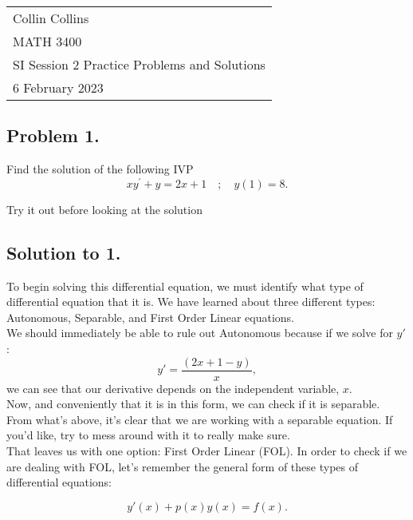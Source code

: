 \documentclass[a4paper,12pt]{article}
\begin{document}

\thispagestyle{empty}

\begin{tabular}{p{15.5cm}}
\\ Collin Collins \\
MATH 3400\\
SI Session 2 Practice Problems and Solutions\\
6 February 2023 \\
\hline

\end{tabular} 

\subsection*{Problem 1.}

Find the solution of the following IVP
$$ x y^{\prime}+y=2 x+1 \quad;\quad y(1)=8.$$

Try it out before looking at the solution

\pagebreak

\subsection*{Solution to 1.}

To begin solving this differential equation, we must identify what type of differential equation that it is. We have learned about three different types: Autonomous, Separable, and First Order Linear equations.\\

We should immediately be able to rule out Autonomous because if we solve for $y'$:
$$ y' = \frac{(2x+1 - y)}{x}, $$
we can see that our derivative depends on the independent variable, $x$.\\

Now, and conveniently that it is in this form, we can check if it is separable. From what's above, it's clear that we are working with a separable equation. If you'd like, try to mess around with it to really make sure.\\

That leaves us with one option: First Order Linear (FOL). In order to check if we are dealing with FOL, let's remember the general form of these types of differential equations:

$$ y'(x) + p(x)y(x) = f(x). $$
\end{document}
